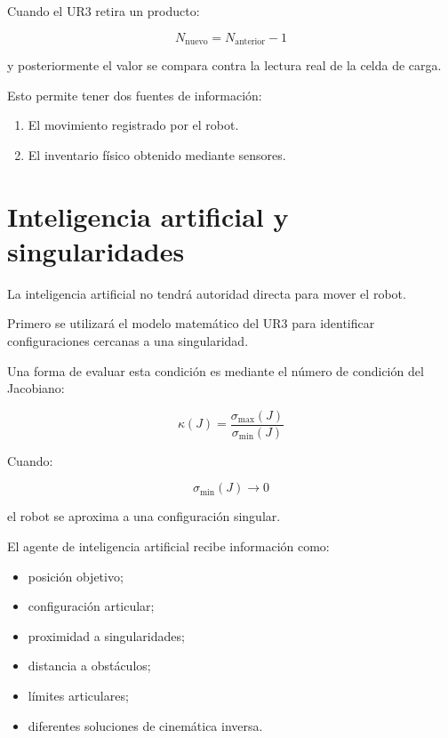 \documentclass[12pt,letterpaper]{article}
\begin{document}
Cuando el UR3 retira un producto:

\[
N_{\text{nuevo}} = N_{\text{anterior}} - 1
\]

y posteriormente el valor se compara contra la lectura real de la
celda de carga.

Esto permite tener dos fuentes de información:

\begin{enumerate}[leftmargin=1.2cm]

    \item El movimiento registrado por el robot.
    \item El inventario físico obtenido mediante sensores.

\end{enumerate}

\section{Inteligencia artificial y singularidades}

La inteligencia artificial no tendrá autoridad directa para mover el
robot.

Primero se utilizará el modelo matemático del UR3 para identificar
configuraciones cercanas a una singularidad.

Una forma de evaluar esta condición es mediante el número de condición
del Jacobiano:

\[
\kappa(J)=
\frac{\sigma_{\max}(J)}
{\sigma_{\min}(J)}
\]

Cuando:

\[
\sigma_{\min}(J)\rightarrow 0
\]

el robot se aproxima a una configuración singular.

El agente de inteligencia artificial recibe información como:

\begin{itemize}[leftmargin=1.2cm]

    \item posición objetivo;
    \item configuración articular;
    \item proximidad a singularidades;
    \item distancia a obstáculos;
    \item límites articulares;
    \item diferentes soluciones de cinemática inversa.

\end{itemize}
\end{document}
